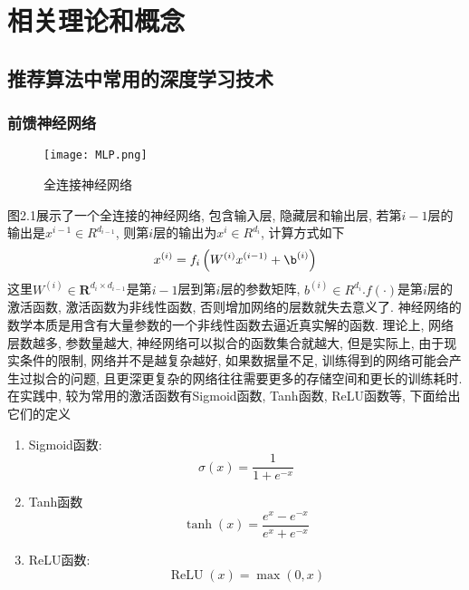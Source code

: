 \chapter{相关理论和概念}
\section{推荐算法中常用的深度学习技术}
\subsection{前馈神经网络}
\begin{figure}[htbp]
	\centering
	\texttt{[image: MLP.png]}
	\caption{全连接神经网络}
	\label{FIGhtmltext}
\end{figure}
图2.1展示了一个全连接的神经网络, 包含输入层, 隐藏层和输出层, 若第$i-1$层的输出是$x^{i-1} \in R^{d_{i-1}} $, 则第$i$层的输出为$x^{i} \in R^{d_{i}} $, 计算方式如下
\begin{equation}
		x^{(i)}=f_{i}\left(W^{(i)} x^{(i-1)}+\b^{(i)}\right)
\end{equation}
这里$W^{(i)} \in \mathbf{R}^{d_{i} \times d_{i-1}}$是第$i-1$层到第$i$层的参数矩阵, $b^{(i)} \in R^{d_i}$.$f(\cdot)$是第$i$层的激活函数, 激活函数为非线性函数, 否则增加网络的层数就失去意义了. 神经网络的数学本质是用含有大量参数的一个非线性函数去逼近真实解的函数. 理论上, 网络层数越多, 参数量越大, 神经网络可以拟合的函数集合就越大, 但是实际上, 由于现实条件的限制, 网络并不是越复杂越好, 如果数据量不足, 训练得到的网络可能会产生过拟合的问题, 且更深更复杂的网络往往需要更多的存储空间和更长的训练耗时. 在实践中, 较为常用的激活函数有Sigmoid函数, Tanh函数, ReLU函数等, 下面给出它们的定义
\begin{enumerate}
	\item Sigmoid函数:
	\begin{equation}
		\sigma(x)=\frac{1}{1+e^{-x}}
	\end{equation}
	\item Tanh函数
	\begin{equation}
		\tanh (x)=\frac{e^{x}-e^{-x}}{e^{x}+e^{-x}}
	\end{equation}
	\item ReLU函数:
	\begin{equation}
		\operatorname{ReLU}(x)=\max (0, x)
	\end{equation}
\end{enumerate}

